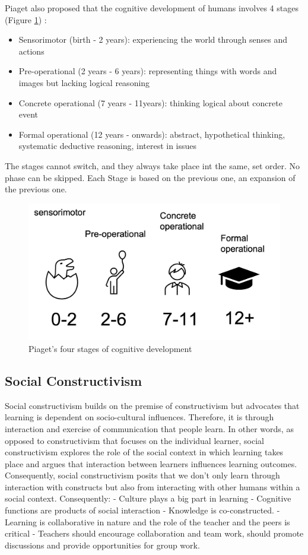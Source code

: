 \documentclass[
]{book}
\providecommand{\tightlist}{%
  \setlength{\itemsep}{0pt}\setlength{\parskip}{0pt}}
\begin{document}
Piaget also proposed that the cognitive development of humans involves 4 stages (Figure \ref{fig:piagetstages}) :

\begin{itemize}
\tightlist
\item
  Sensorimotor (birth - 2 years): experiencing the world through senses and actions
\item
  Pre-operational (2 years - 6 years): representing things with words and images but lacking logical reasoning
\item
  Concrete operational (7 years - 11years): thinking logical about concrete event
\item
  Formal operational (12 years - onwards): abstract, hypothetical thinking, systematic deductive reasoning, interest in issues
\end{itemize}

The stages cannot switch, and they always take place int the same, set order. No phase can be skipped. Each Stage is based on the previous one, an expansion of the previous one.

\begin{figure}
\includegraphics[width=13cm]{./images/piaget-stages} \caption{Piaget's four stages of cognitive development}\label{fig:piagetstages}
\end{figure}

\subsection{Social Constructivism}\label{social-constructivism}

Social constructivism builds on the premise of constructivism but advocates that learning is dependent on socio-cultural influences. Therefore, it is through interaction and exercise of communication that people learn. In other words, as opposed to constructivism that focuses on the individual learner, social constructivism explores the role of the social context in which learning takes place and argues that interaction between learners influences learning outcomes.
Consequently, social constructivism posits that we don't only learn through interaction with constructs but also from interacting with other humans within a social context. Consequently:
- Culture plays a big part in learning
- Cognitive functions are products of social interaction
- Knowledge is co-constructed.
- Learning is collaborative in nature and the role of the teacher and the peers is critical
- Teachers should encourage collaboration and team work, should promote discussions and provide opportunities for group work.
\end{document}
